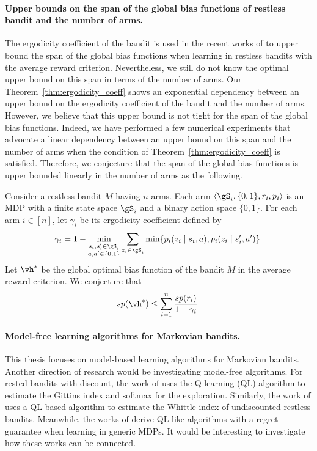 \paragraph{Upper bounds on the span of the global bias functions of restless bandit and the number of arms.}
The ergodicity coefficient of the bandit is used in the recent works of \cite{akbarzadeh2022learning} to upper bound the span of the global bias functions when learning in restless bandits with the average reward criterion.
Nevertheless, we still do not know the optimal upper bound on this span in terms of the number of arms. 
Our Theorem~\ref{thm:ergodicity_coeff} shows an exponential dependency between an upper bound on the ergodicity coefficient of the bandit and the number of arms.
However, we believe that this upper bound is not tight for the span of the global bias functions.
Indeed, we have performed a few numerical experiments that advocate a linear dependency between an upper bound on this span and the number of arms when the condition of Theorem~\ref{thm:ergodicity_coeff} is satisfied.
Therefore, we conjecture that the span of the global bias functions is upper bounded linearly in the number of arms as the following.
\begin{conj}
    \label{conj:span}
    Consider a restless bandit $M$ having $n$ arms.
    Each arm $\langle\gS_i,\{0,1\},r_i,p_i\rangle$ is an MDP with a finite state space $\gS_i$ and a binary action space $\{0,1\}$.
    For each arm $i\in[n]$, let $\gamma_i$ be its ergodicity coefficient defined by
    \begin{align*}
        \gamma_i = 1-\min_{\substack{s_i,s'_i\in\gS_i \\a,a'\in\{0,1\}}} \sum_{z_i\in\gS_i} \min\{p_i(z_i \mid s_i, a), p_i(z_i \mid s'_i, a')\}.
    \end{align*}
    Let $\vh^*$ be the global optimal bias function of the bandit $M$ in the average reward criterion.
    We conjecture that
    \begin{align*}
        sp(\vh^*) \le \sum_{i=1}^n\frac{sp(r_i)}{1-\gamma_i}.
    \end{align*}
\end{conj}

\paragraph{Model-free learning algorithms for Markovian bandits.}
This thesis focuses on model-based learning algorithms for Markovian bandits. 
Another direction of research would be investigating model-free algorithms.
For rested bandits with discount, the work of \cite{duff1995q} uses the Q-learning (QL) algorithm to estimate the Gittins index and softmax for the exploration.
Similarly, the work of \cite{avrachenkov2022whittle} uses a QL-based algorithm to estimate the Whittle index of undiscounted restless bandits.
Meanwhile, the works of \cite{jin2018q, wei2020model} derive QL-like algorithms with a regret guarantee when learning in generic MDPs.
It would be interesting to investigate how these works can be connected.

